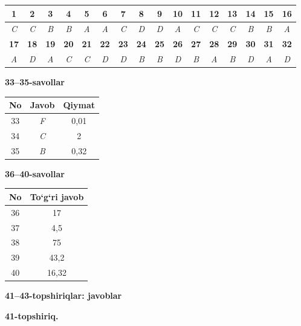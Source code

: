 \documentclass[11pt,a4paper]{article}
\begin{document}
\noindent\begin{tabular}{|c|c|c|c|c|c|c|c|c|c|c|c|c|c|c|c|}\hline
\textbf{1} & \textbf{2} & \textbf{3} & \textbf{4} & \textbf{5} & \textbf{6} & \textbf{7} & \textbf{8} & \textbf{9} & \textbf{10} & \textbf{11} & \textbf{12} & \textbf{13} & \textbf{14} & \textbf{15} & \textbf{16}\\\hline
\textsl{C} & \textsl{C} & \textsl{B} & \textsl{B} & \textsl{A} & \textsl{A} & \textsl{C} & \textsl{D} & \textsl{D} & \textsl{A} & \textsl{C} & \textsl{C} & \textsl{C} & \textsl{B} & \textsl{B} & \textsl{A}\\\hline
\textbf{17} & \textbf{18} & \textbf{19} & \textbf{20} & \textbf{21} & \textbf{22} & \textbf{23} & \textbf{24} & \textbf{25} & \textbf{26} & \textbf{27} & \textbf{28} & \textbf{29} & \textbf{30} & \textbf{31} & \textbf{32}\\\hline
\textsl{A} & \textsl{D} & \textsl{A} & \textsl{C} & \textsl{C} & \textsl{D} & \textsl{D} & \textsl{B} & \textsl{B} & \textsl{D} & \textsl{B} & \textsl{A} & \textsl{B} & \textsl{D} & \textsl{A} & \textsl{D}\\\hline
\end{tabular}\par\medskip
\noindent\textbf{33--35-savollar}\par\smallskip
\noindent\begin{tabular}{|c|c|c|}\hline \textbf{No} & \textbf{Javob} & \textbf{Qiymat}\\\hline
33 & \textsl{F} & 0,01\\\hline
34 & \textsl{C} & 2\\\hline
35 & \textsl{B} & 0,32\\\hline
\end{tabular}\par\medskip
\noindent\textbf{36--40-savollar}\par\smallskip
\noindent\begin{tabular}{|c|c|}\hline \textbf{No} & \textbf{To`g`ri javob}\\\hline
36 & 17\\\hline
37 & 4,5\\\hline
38 & 75\\\hline
39 & 43,2\\\hline
40 & 16,32\\\hline
\end{tabular}\par\medskip
\noindent\textbf{41--43-topshiriqlar: javoblar}\par\smallskip
\noindent\textbf{41-topshiriq.}\par
\end{document}
